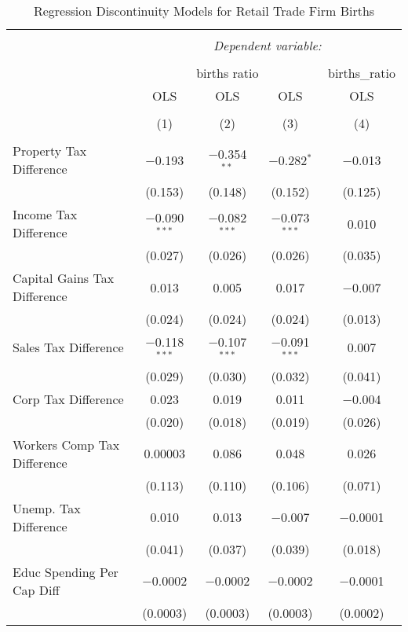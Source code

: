
\begin{table}[!htbp] \centering 
  \caption{Regression Discontinuity Models for  Retail Trade Firm Births} 
  \label{44-45rd} 
\begin{tabular}{@{\extracolsep{5pt}}lcccc} 
\\[-1.8ex]\hline 
\hline \\[-1.8ex] 
 & \multicolumn{4}{c}{\textit{Dependent variable:}} \\ 
\cline{2-5} 
\\[-1.8ex] & \multicolumn{3}{c}{births ratio} & births\_ratio \\ 
 & OLS & OLS & OLS & OLS \\ 
\\[-1.8ex] & (1) & (2) & (3) & (4)\\ 
\hline \\[-1.8ex] 
 Property Tax Difference & $-$0.193 & $-$0.354$^{**}$ & $-$0.282$^{*}$ & $-$0.013 \\ 
  & (0.153) & (0.148) & (0.152) & (0.125) \\ 
  Income Tax Difference & $-$0.090$^{***}$ & $-$0.082$^{***}$ & $-$0.073$^{***}$ & 0.010 \\ 
  & (0.027) & (0.026) & (0.026) & (0.035) \\ 
  Capital Gains Tax Difference & 0.013 & 0.005 & 0.017 & $-$0.007 \\ 
  & (0.024) & (0.024) & (0.024) & (0.013) \\ 
  Sales Tax Difference & $-$0.118$^{***}$ & $-$0.107$^{***}$ & $-$0.091$^{***}$ & 0.007 \\ 
  & (0.029) & (0.030) & (0.032) & (0.041) \\ 
  Corp Tax Difference & 0.023 & 0.019 & 0.011 & $-$0.004 \\ 
  & (0.020) & (0.018) & (0.019) & (0.026) \\ 
  Workers Comp Tax Difference & 0.00003 & 0.086 & 0.048 & 0.026 \\ 
  & (0.113) & (0.110) & (0.106) & (0.071) \\ 
  Unemp. Tax Difference & 0.010 & 0.013 & $-$0.007 & $-$0.0001 \\ 
  & (0.041) & (0.037) & (0.039) & (0.018) \\ 
  Educ Spending Per Cap Diff & $-$0.0002 & $-$0.0002 & $-$0.0002 & $-$0.0001 \\ 
  & (0.0003) & (0.0003) & (0.0003) & (0.0002) \\ 

\end{tabular}
\end{table}
